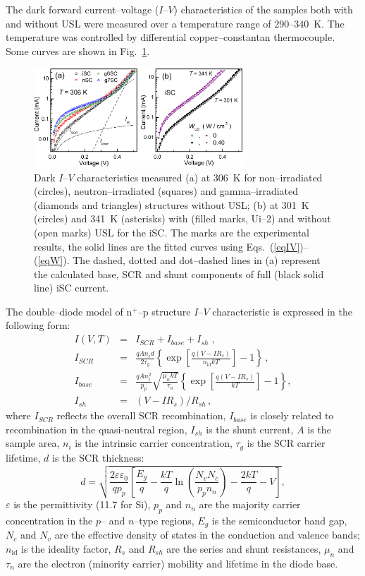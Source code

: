 \documentclass[aip,jap, amsmath,amssymb,reprint]{revtex4-1}
\begin{document}
The dark forward current--voltage ($I$--$V$) characteristics of the samples both with and without USL were measured over a temperature range of 290--340~K.
The temperature was controlled by differential copper--constantan thermocouple.
Some curves are shown in Fig.~\ref{figIV}.


\begin{figure}
\includegraphics[width=0.7\textwidth]{fig_1ab}%
\caption{\label{figIV}
Dark $I$--$V$ characteristics measured (a) at 306~K for non--irradiated (circles), neutron--irradiated (squares) and gamma--irradiated (diamonds and triangles) structures without USL;
(b) at 301~K (circles) and 341~K (asterisks) with (filled marks, Ui--2) and without (open marks) USL for the iSC.
The marks are the experimental results, the solid lines are the fitted curves using Eqs.~(\ref{eqIV})--(\ref{eqW}).
The dashed, dotted and dot--dashed lines in (a) represent the calculated base, SCR and shunt components of full (black solid line) iSC current.
}%
\end{figure}

The double--diode model of n$^+$--p structure $I$--$V$ characteristic is expressed in the following form:
\begin{eqnarray}
I(V,T)&=&I_{SCR}+I_{base}+I_{sh}\;,\label{eqIV}\\
I_{SCR}&=&\frac{qAn_id}{2\tau_{g}}\left\{\exp \left[\frac{q(V-IR_s)}{n_{\mathrm{id}}kT}\right]-1\right\}\,,\label{eqIscr}\\
I_{base}&=&\frac{qAn_i^2}{p_p}\sqrt{\frac{\mu_nkT}{\tau_n}}\left\{\exp \left[\frac{q(V-IR_s)}{kT}\right]-1\right\},\label{eqIbase}\\
I_{sh}&=&(V-IR_s)/R_{sh}\,,\label{eqIsh}
\end{eqnarray}
where
$I_{SCR}$ reflects the overall SCR recombination,
$I_{base}$ is closely related to recombination in the quasi-neutral region,
$I_{sh}$ is the shunt current,
$A$ is the sample area,
$n_i$ is the intrinsic carrier concentration,
$\tau_{g}$ is the SCR carrier lifetime,
$d$ is the  SCR thickness:
\begin{equation}
\label{eqW}
    d=\sqrt{\frac{2 \varepsilon \varepsilon_0}{q p_p}\left[
     \frac{E_g}{q}-\frac{kT}{q}\ln\!\left(\frac{N_vN_c}{p_pn_n}\right)-\frac{2kT}{q}-V\right]},
\end{equation}
$\varepsilon$ is the permittivity (11.7 for Si),
$p_p$ and $n_n$ are the majority carrier concentration in the $p$-- and $n$--type regions,
$E_g$ is the semiconductor band gap,
$N_c$ and $N_v$ are the effective density of states in the conduction and valence bands;
$n_{\mathrm{id}}$ is the ideality factor,
$R_s$ and $R_{sh}$ are the series and shunt resistances,
$\mu_n$ and $\tau_n$ are the electron (minority carrier) mobility and lifetime in the diode base.
\end{document}
